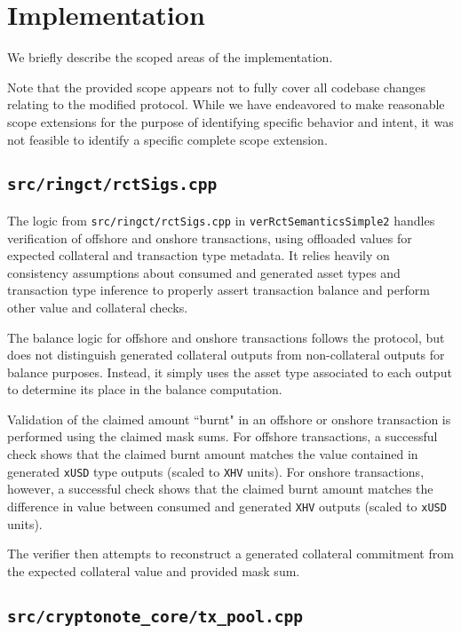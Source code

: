 \documentclass{article}
\begin{document}
\section{Implementation}

We briefly describe the scoped areas of the implementation.

Note that the provided scope appears not to fully cover all codebase changes relating to the modified protocol.
While we have endeavored to make reasonable scope extensions for the purpose of identifying specific behavior and intent, it was not feasible to identify a specific complete scope extension.


\subsection{\texttt{src/ringct/rctSigs.cpp}}

The logic from \texttt{src/ringct/rctSigs.cpp} in \texttt{verRctSemanticsSimple2} handles verification of offshore and onshore transactions, using offloaded values for expected collateral and transaction type metadata.
It relies heavily on consistency assumptions about consumed and generated asset types and transaction type inference to properly assert transaction balance and perform other value and collateral checks.

The balance logic for offshore and onshore transactions follows the protocol, but does not distinguish generated collateral outputs from non-collateral outputs for balance purposes.
Instead, it simply uses the asset type associated to each output to determine its place in the balance computation.

Validation of the claimed amount ``burnt" in an offshore or onshore transaction is performed using the claimed mask sums.
For offshore transactions, a successful check shows that the claimed burnt amount matches the value contained in generated \texttt{xUSD} type outputs (scaled to \texttt{XHV} units).
For onshore transactions, however, a successful check shows that the claimed burnt amount matches the difference in value between consumed and generated \texttt{XHV} outputs (scaled to \texttt{xUSD} units).

The verifier then attempts to reconstruct a generated collateral commitment from the expected collateral value and provided mask sum.


\subsection{\texttt{src/cryptonote\_core/tx\_pool.cpp}}
\end{document}
